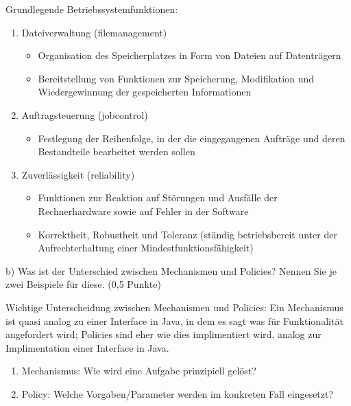 \documentclass[a4paper,12pt]{article}
\begin{document}
\vspace{\baselineskip}
\vspace{\baselineskip}
\vspace{\baselineskip}
\large Grundlegende Betriebssystemfunktionen:
\normalsize
\begin{enumerate}
	\item Dateiverwaltung (filemanagement)
	\begin{itemize}
		\item Organisation des Speicherplatzes in Form von Dateien auf Datenträgern
		\item Bereitstellung von Funktionen zur Speicherung, Modifikation und Wiedergewinnung der gespeicherten Informationen
	\end{itemize}
	\item Auftragsteuerung (jobcontrol)
	\begin{itemize}
		\item Festlegung der Reihenfolge, in der die eingegangenen Aufträge und deren Bestandteile bearbeitet werden sollen
	\end{itemize}
	\item Zuverlässigkeit (reliability)
	\begin{itemize}
		\item Funktionen zur Reaktion auf Störungen und Ausfälle der Rechnerhardware sowie auf Fehler in der Software
		\item Korrektheit, Robustheit und Toleranz (ständig betriebsbereit unter der Aufrechterhaltung einer Mindestfunktionsfähigkeit)
	\end{itemize}
\end{enumerate}

\vspace{\baselineskip}
 b) Was ist der Unterschied zwischen Mechanismen und Policies? Nennen Sie je zwei Beispiele für diese.
(0,5 Punkte)

\vspace{\baselineskip}

 \large Wichtige Unterscheidung zwischen Mechanismen und Policies:
 \normalsize
 	Ein Mechanismus ist quasi analog zu einer Interface in Java, in dem es sagt was für Funktionalität angefordert wird; Policies sind eher wie dies implimentiert wird, analog zur Implimentation einer Interface in Java.
	\begin{enumerate}
		\item Mechanismus: Wie wird eine Aufgabe prinzipiell gelöst?
		\item Policy: Welche Vorgaben/Parameter werden im konkreten Fall eingesetzt?


	\end{enumerate}
\end{document}
